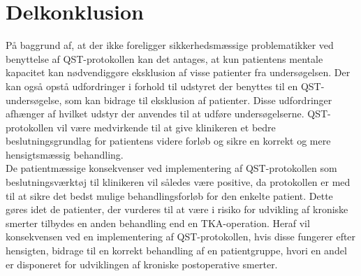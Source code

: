 \section{Delkonklusion}
På baggrund af, at der ikke foreligger sikkerhedsmæssige problematikker ved benyttelse af QST-protokollen kan det antages, at kun patientens mentale kapacitet kan nødvendiggøre eksklusion af visse patienter fra undersøgelsen. Der kan også opstå udfordringer i forhold til udstyret der benyttes til en QST-undersøgelse, som kan bidrage til eksklusion af patienter. Disse udfordringer afhænger af hvilket udstyr der anvendes til at udføre undersøgelserne. QST-protokollen vil være medvirkende til at give klinikeren et bedre beslutningsgrundlag for patientens videre forløb og sikre en korrekt og mere hensigtsmæssig behandling. \\
De patientmæssige konsekvenser ved implementering af QST-protokollen som beslutningsværktøj til klinikeren vil således være positive, da protokollen er med til at sikre det bedst mulige behandlingsforløb for den enkelte patient. Dette gøres idet de patienter, der vurderes til at være i risiko for udvikling af kroniske smerter tilbydes en anden behandling end en TKA-operation. Heraf vil konsekvensen ved en implementering af QST-protokollen, hvis disse fungerer efter hensigten, bidrage til en korrekt behandling af en patientgruppe, hvori en andel er disponeret for udviklingen af kroniske postoperative smerter.


